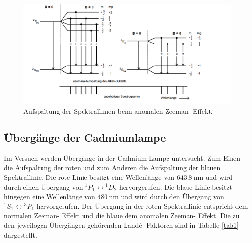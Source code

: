 \FloatBarrier
\begin{figure}
  \centering
  \includegraphics[scale=0.5]{anomal.PNG}
  \caption{Aufspaltung der Spektrallinien beim anomalen Zeeman- Effekt. \cite{Q1}}
  \label{abb3}
\end{figure}
\FloatBarrier

\subsection{Übergänge der Cadmiumlampe}
Im Versuch werden Übergänge in der Cadmium Lampe untersucht. Zum Einen die Aufspaltung der roten
und zum Anderen die Aufspaltung der blauen Spektrallinie.
Die rote Linie besitzt eine Wellenlänge von $\SI{643,8}{\nano\meter}$ und wird durch einen
Übergang von ${}^1P_1\leftrightarrow{}^1D_2$ hervorgerufen. Die blaue Linie besitzt
hingegen eine Wellenlänge von $\SI{480}{\nano \meter}$ und wird durch den Übergang von
${}^1S_1\leftrightarrow{}^3P_1$ hervorgerufen.
Der Übergang in der roten Spektrallinie entspricht dem normalen Zeeman- Effekt und die
blaue dem anomalen Zeeman- Effekt.
Die zu den jeweilogen Übergängen gehörenden Landé- Faktoren sind in Tabelle \ref{tab1} dargestellt.
\FloatBarrier


